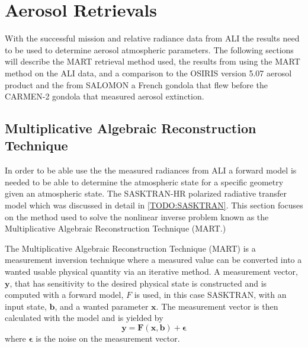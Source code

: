\section{Aerosol Retrievals}

With the successful mission and relative radiance data from ALI the results need to be used to determine aerosol atmospheric parameters. The following sections will describe the MART retrieval method used, the results from using the MART method on the ALI data, and a comparison to the OSIRIS version 5.07 aerosol product and the from SALOMON a French gondola that flew before the CARMEN-2 gondola that measured aerosol extinction.

\subsection{Multiplicative Algebraic Reconstruction Technique}

In order to be able use the the measured radiances from ALI a forward model is needed to be able to determine the atmospheric state for a specific geometry given an atmospheric state. The SASKTRAN-HR polarized radiative transfer model \citep{Dueck2015} which was discussed in detail in \autoref{TODO:SASKTRAN}. This section focuses on the method used to solve the nonlinear inverse problem known as the Multiplicative Algebraic Reconstruction Technique (MART.)

The Multiplicative Algebraic Reconstruction Technique (MART) is a measurement inversion technique where a measured value can be converted into a wanted usable physical quantity via an iterative method. A measurement vector, $\mathbf{y}$, that has sensitivity to the desired physical state is constructed and is computed with a forward model, $F$ is used, in this case SASKTRAN, with an input state, $\mathbf{b}$, and a wanted parameter $\mathbf{x}$. The measurement vector is then calculated with the model and is yielded by
\begin{equation}
 \mathbf{y} = \mathbf{F}(\mathbf{x},\mathbf{b}) + \boldsymbol{\epsilon}
\end{equation}
where $\boldsymbol{\epsilon}$ is the noise on the measurement vector.

